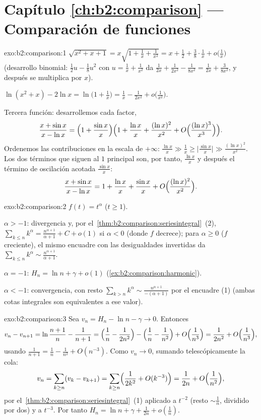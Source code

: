\section*{Capítulo \ref{ch:b2:comparison} --- Comparación de funciones}

\begin{solution}{exo:b2:comparison:1}
$\sqrt{x^2 + x + 1} = x\sqrt{1 + \tfrac1x + \tfrac{1}{x^2}} = x +
\frac12 + \frac38\cdot\frac1x + o\bigl(\frac1x\bigr)$ (desarrollo
binomial: $\frac12 u - \frac18 u^2$ con $u = \frac1x +
\frac{1}{x^2}$ da $\frac{1}{2x} + \frac{1}{2x^2} - \frac{1}{8x^2} =
\frac{1}{2x} + \frac{3}{8x^2}$, y después se multiplica por $x$).

$\ln(x^2 + x) - 2\ln x = \ln\bigl(1 + \tfrac1x\bigr) = \frac1x -
\frac{1}{2x^2} + o\bigl(\frac{1}{x^2}\bigr)$.

Tercera función: desarrollemos cada factor,
\[
\frac{x + \sin x}{x - \ln x}
= \Bigl(1 + \frac{\sin x}{x}\Bigr)
\Bigl(1 + \frac{\ln x}{x} + \frac{(\ln x)^2}{x^2} +
O\Bigl(\frac{(\ln x)^3}{x^3}\Bigr)\Bigr).
\]
Ordenemos las contribuciones en la escala de $+\infty$: $\frac{\ln
x}{x} \gg \frac{1}{x} \geq \bigl|\frac{\sin x}{x}\bigr| \gg
\frac{(\ln x)^2}{x^2}$. Los dos términos que siguen al $1$ principal
son, por tanto, $\frac{\ln x}{x}$ y después el término de oscilación
acotada $\frac{\sin x}{x}$:
\[
\frac{x + \sin x}{x - \ln x}
= 1 + \frac{\ln x}{x} + \frac{\sin x}{x}
+ O\Bigl(\frac{(\ln x)^2}{x^2}\Bigr).
\]
\end{solution}

\begin{solution}{exo:b2:comparison:2}
$f(t) = t^\alpha$ ($t \geq 1$).

$\alpha > -1$: divergencia y, por el~\cref{thm:b2:comparison:seriesintegral}~(2), $\sum_{k\leq n}
k^\alpha = \frac{n^{\alpha+1}}{\alpha+1} + C + o(1)$ si $\alpha < 0$
(donde $f$ decrece); para $\alpha \geq 0$ ($f$ creciente), el mismo
encuadre con las desigualdades invertidas da $\sum_{k \leq n}
k^\alpha \sim \frac{n^{\alpha + 1}}{\alpha + 1}$.

$\alpha = -1$: $H_n = \ln n + \gamma + o(1)$
(\cref{ex:b2:comparison:harmonic}).

$\alpha < -1$: convergencia, con resto $\sum_{k > n} k^\alpha \sim
\frac{n^{\alpha+1}}{-(\alpha+1)}$ por el encuadre (1) (ambas cotas
integrales son equivalentes a ese valor).
\end{solution}

\begin{solution}{exo:b2:comparison:3}
Sea $v_n = H_n - \ln n - \gamma \to 0$. Entonces
\[
v_n - v_{n+1} = \ln\frac{n+1}{n} - \frac{1}{n+1}
= \Bigl(\frac1n - \frac{1}{2n^2}\Bigr) - \Bigl(\frac1n -
\frac{1}{n^2}\Bigr) + O\Bigl(\frac{1}{n^3}\Bigr)
= \frac{1}{2n^2} + O\Bigl(\frac{1}{n^3}\Bigr),
\]
usando $\frac{1}{n+1} = \frac1n - \frac{1}{n^2} + O(n^{-3})$. Como
$v_n \to 0$, sumando telescópicamente la cola:
\[
v_n = \sum_{k \geq n} (v_k - v_{k+1})
= \sum_{k\geq n} \Bigl(\frac{1}{2k^2} + O(k^{-3})\Bigr)
= \frac{1}{2n} + O\Bigl(\frac{1}{n^2}\Bigr),
\]
por el~\cref{thm:b2:comparison:seriesintegral}~(1) aplicado a
$t^{-2}$ (resto $\sim \frac1n$, dividido por dos) y a $t^{-3}$. Por
tanto $H_n = \ln n + \gamma + \frac{1}{2n} + o(\frac1n)$.
\end{solution}

